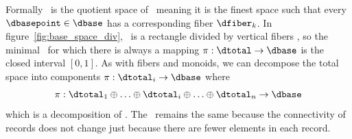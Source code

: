 \documentclass[../main.tex]{subfiles}
\begin{document}
Formally \dbase\ is the quotient space \cite{QuotientSpaceTopology2020} of \dtotal\, meaning it is the finest space\cite{aurouxMath131Introduction} such that every $\dbasepoint \in \dbase$ has a corresponding fiber $\dfiber_k$\cite{QuotientSpaceTopology2020}. In figure~\ref{fig:base_space_div}, \dtotal\ is a rectangle divided by vertical fibers \dfiber, so the minimal \dbase\ for which there is always a mapping $\pi: \dtotal\rightarrow \dbase$ is the closed interval $\left[0,1\right]$. 
As with fibers and monoids, we can decompose the total space into components $\pi:\dtotal_i\rightarrow \dbase$ where
\begin{equation}
    \pi:\dtotal_1\oplus\ldots\oplus \dtotal_i \oplus\ldots \oplus \dtotal_n \rightarrow \dbase
\end{equation}
which is a decomposition of \dfiber. The \dbase\ remains the same because the connectivity of records does not change just because there are fewer elements in each record.
\end{document}
